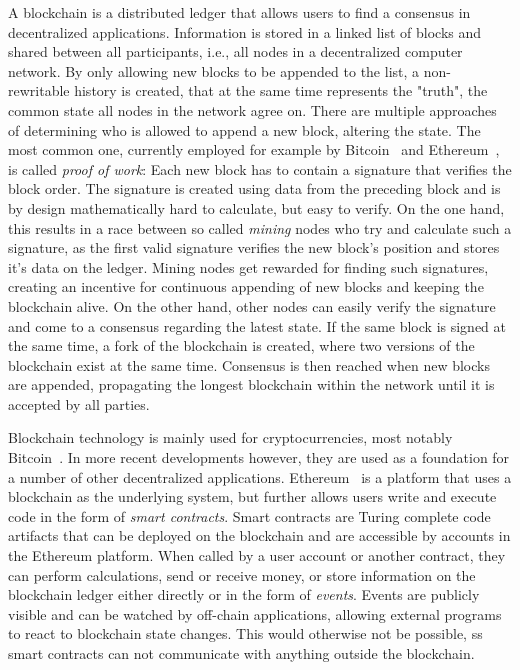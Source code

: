 \documentclass[runningheads]{llncs}
\begin{document}
A blockchain is a distributed ledger that allows users to find a consensus in decentralized applications.
Information is stored in a linked list of blocks and shared between all participants, i.e., all nodes in a decentralized computer network.
By only allowing new blocks to be appended to the list, a non-rewritable history is created, that at the same time represents the "truth", the common state all nodes in the network agree on.
There are multiple approaches of determining who is allowed to append a new block, altering the state.
The most common one, currently employed for example by Bitcoin~\cite{nakamoto2008bitcoin} and Ethereum~\cite{wood2014ethereum}, is called \emph{proof of work}:
Each new block has to contain a signature that verifies the block order.
The signature is created using data from the preceding block and is by design mathematically hard to calculate, but easy to verify.
On the one hand, this results in a race between so called \emph{mining} nodes who try and calculate such a signature, as the first valid signature verifies the new block's position and stores it's data on the ledger.
Mining nodes get rewarded for finding such signatures, creating an incentive for continuous appending of new blocks and keeping the blockchain alive.
On the other hand, other nodes can easily verify the signature and come to a consensus regarding the latest state.
If the same block is signed at the same time, a fork of the blockchain is created, where two versions of the blockchain exist at the same time.
Consensus is then reached when new blocks are appended, propagating the longest blockchain within the network until it is accepted by all parties.

Blockchain technology is mainly used for cryptocurrencies, most notably Bitcoin~\cite{nakamoto2008bitcoin}.
In more recent developments however, they are used as a foundation for a number of other decentralized applications.
Ethereum~\cite{wood2014ethereum} is a platform that uses a blockchain as the underlying system, but further allows users write and execute code in the form of \emph{smart contracts}.
Smart contracts are Turing complete code artifacts that can be deployed on the blockchain and are accessible by accounts in the Ethereum platform.
When called by a user account or another contract, they can perform calculations, send or receive money, or store information on the blockchain ledger either directly or in the form of \emph{events}.
Events are publicly visible and can be watched by off-chain applications, allowing external programs to react to blockchain state changes.
This would otherwise not be possible, ss smart contracts can not communicate with anything outside the blockchain.
\end{document}
